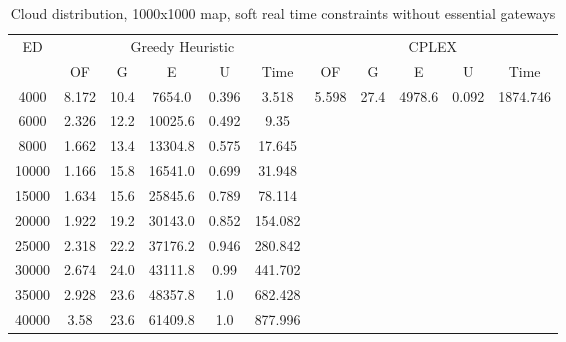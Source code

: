 \begin{table}[htb]
	\centering
	\begin{tabular}{|c|c|c|c|c|c|c|c|c|c|c|}
		\hline
		\multirow{2}{*}{ED} & \multicolumn{5}{c|}{Greedy Heuristic} & \multicolumn{5}{c|}{CPLEX}\\ 
		\cline{2-11}
& OF & G & E & U & Time & OF & G & E & U & Time\\ 
		\hline
		4000 & 8.172 & 10.4 & 7654.0 & 0.396 & 3.518 & 5.598 & 27.4 & 4978.6 & 0.092 & 1874.746 \\ 
		6000 & 2.326 & 12.2 & 10025.6 & 0.492 & 9.35 & & & & &  \\ 
		8000 & 1.662 & 13.4 & 13304.8 & 0.575 & 17.645 & & & & &  \\ 
		10000 & 1.166 & 15.8 & 16541.0 & 0.699 & 31.948 & & & & &  \\ 
		15000 & 1.634 & 15.6 & 25845.6 & 0.789 & 78.114 & & & & &  \\ 
		20000 & 1.922 & 19.2 & 30143.0 & 0.852 & 154.082 & & & & &  \\ 
		25000 & 2.318 & 22.2 & 37176.2 & 0.946 & 280.842 & & & & &  \\ 
		30000 & 2.674 & 24.0 & 43111.8 & 0.99 & 441.702 & & & & &  \\ 
		35000 & 2.928 & 23.6 & 48357.8 & 1.0 & 682.428 & & & & &  \\ 
		40000 & 3.58 & 23.6 & 61409.8 & 1.0 & 877.996 & & & & &  \\ 
		\hline 
	\end{tabular} 
	\caption{Cloud distribution, 1000x1000 map, soft real time constraints without essential gateways} 
	\label{tab:cloud_soft_n_esc_1000} 
\end{table} 

